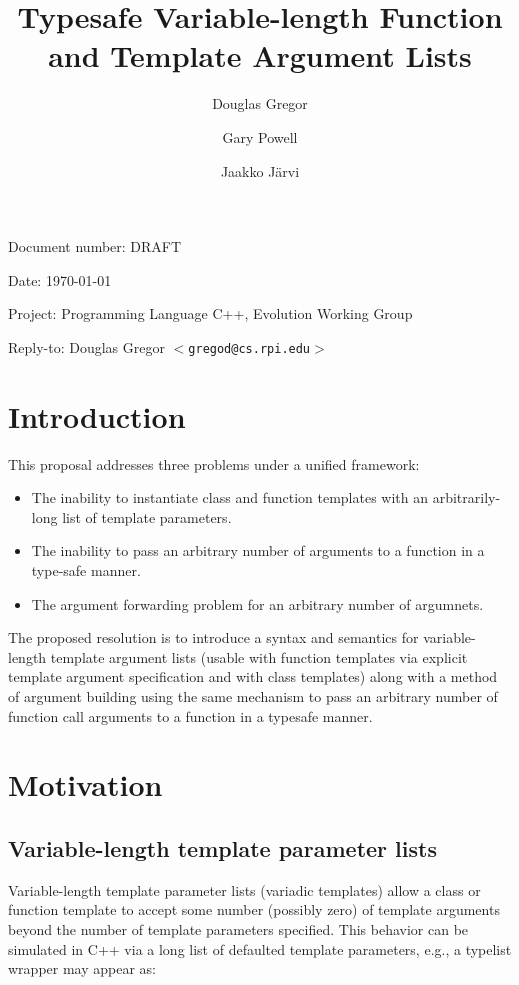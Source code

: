 \documentclass{article}
\begin{document}
\pagestyle{myheadings}

\title{Typesafe Variable-length Function and Template Argument Lists}
\author{Douglas Gregor \and Gary Powell \and Jaakko J\"arvi}
\date{}
\maketitle

\par\noindent Document number: DRAFT
\par\noindent Date: \today
\par\noindent Project: Programming Language C++, Evolution Working Group
\par\noindent Reply-to: Douglas Gregor $<${\tt gregod@cs.rpi.edu}$>$

\section{Introduction}
This proposal addresses three problems under a unified framework:
\begin{itemize}
\item The inability to instantiate class and function templates with an arbitrarily-long list of template parameters.
\item The inability to pass an arbitrary number of arguments to a function in a type-safe manner.
\item The argument forwarding problem for an arbitrary number of argumnets.
\end{itemize}

The proposed resolution is to introduce a syntax and semantics for
variable-length template argument lists (usable with function templates
via explicit template argument specification and with class templates)
along with a method of argument building using the same mechanism to
pass an arbitrary number of function call arguments to a function in a
typesafe manner.

\section{Motivation}
\subsection{Variable-length template parameter lists}
Variable-length template parameter lists (variadic templates) allow a class or
function template to accept some number (possibly zero) of template
arguments beyond the number of template parameters specified. This
behavior can be simulated in C++ via a long list of defaulted template
parameters, e.g., a typelist wrapper may appear as:
\end{document}
